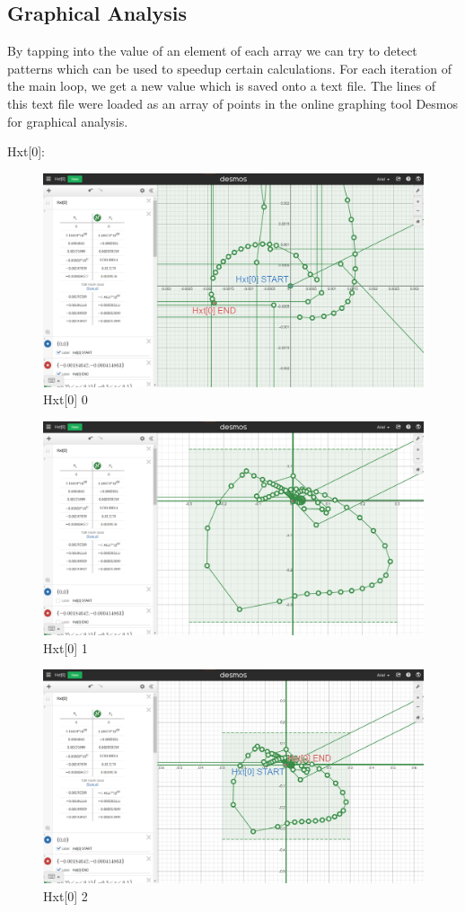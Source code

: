 \subsection{Graphical Analysis}

By tapping into the value of an element of each array we can try to detect
patterns which can be used to speedup certain calculations. For each iteration
of the main loop, we get a new value which is saved onto a text file. The lines
of this text file were loaded as an array of points in the online graphing tool
Desmos for graphical analysis.

Hxt[0]:
\begin{figure}[H]
    \includegraphics[width=\columnwidth]{figs/Hxt[0]_0}
    \caption{Hxt[0] 0}
\end{figure}
\begin{figure}[H]
    \includegraphics[width=\columnwidth]{figs/Hxt[0]_1}
    \caption{Hxt[0] 1}
\end{figure}
\begin{figure}[H]
    \includegraphics[width=\columnwidth]{figs/Hxt[0]_2}
    \caption{Hxt[0] 2}
\end{figure}
